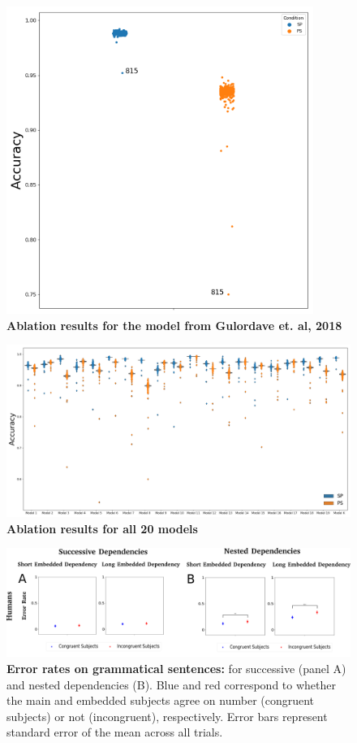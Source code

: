 \documentclass[a4paper, 11pt]{article}
\newcommand{\beginsupplement}{%
        \setcounter{table}{0}
        \renewcommand{\thetable}{S\arabic{table}}%
        \setcounter{figure}{0}
        \renewcommand{\thefigure}{S\arabic{figure}}%
     }
\begin{document}
\beginsupplement

\begin{figure}
    \centering
    \includegraphics[width=10cm]{figures/Ablation_results_K_model.png}
    \caption{\textbf{Ablation results for the model from Gulordave et. al, 2018}}
    \label{fig:ablation_K_model}
\end{figure}

\begin{figure}
    \centering
    \includegraphics[width=15cm]{figures/Ablation_results_all_models.png}
    \caption{\textbf{Ablation results for all 20 models}}
    \label{fig:ablation_all_models}
\end{figure}


\begin{figure}[h]
    \centering
    \includegraphics[width=16cm]{figures/error_rates_acceptable_by_congruence.png}
    \caption{\textbf{Error rates on grammatical sentences:} for successive (panel A) and nested dependencies (B). Blue and red correspond to whether the main and embedded subjects agree on number (congruent subjects) or not (incongruent), respectively. Error bars represent standard error of the mean across all trials.}
    \label{fig:error_rates_all_conditions}
\end{figure}
\end{document}
